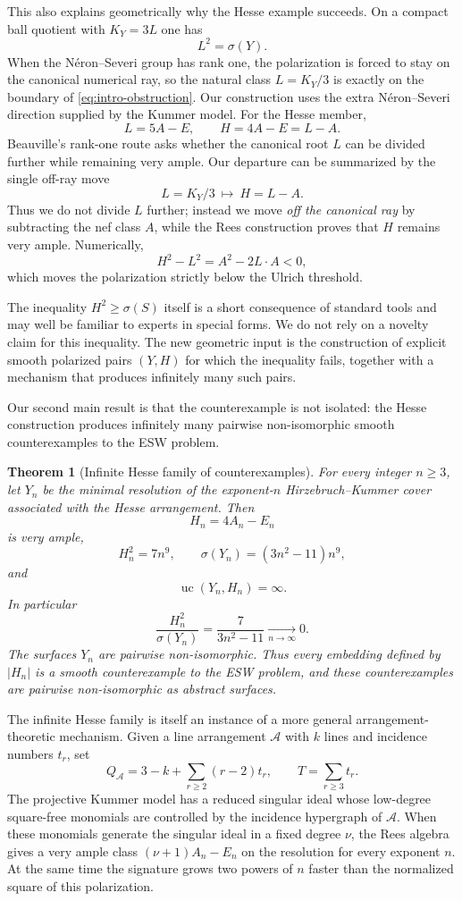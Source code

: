 \documentclass[11pt]{article}
\newtheorem{theorem}{Theorem}[section]
\newcommand{\cA}{\mathcal A}
\newcommand{\sig}{\sigma}
\newcommand{\uc}{\operatorname{uc}}
\begin{document}
This also explains geometrically why the Hesse example succeeds.  On a compact
ball quotient with $K_Y=3L$ one has
\[
        L^2=\sig(Y).
\]
When the N\'eron--Severi group has rank one, the polarization is forced to stay
on the canonical numerical ray, so the natural class $L=K_Y/3$ is exactly on the
boundary of \eqref{eq:intro-obstruction}.  Our construction uses the extra
N\'eron--Severi direction supplied by the Kummer model.  For the Hesse member,
\[
        L=5A-E,\qquad H=4A-E=L-A.
\]
Beauville's rank-one route asks whether the canonical root $L$ can be divided
further while remaining very ample.  Our departure can be summarized by the
single off-ray move
\[
             \boxed{\quad L=K_Y/3\ \longmapsto\ H=L-A.\quad}
\]
Thus we do not divide $L$ further; instead we move \emph{off the canonical ray}
by subtracting the nef class $A$, while the Rees construction proves that $H$
remains very ample.  Numerically,
\[
        H^2-L^2=A^2-2L\cdot A<0,
\]
which moves the polarization strictly below the Ulrich threshold.

The inequality $H^2\ge\sig(S)$ itself is a short consequence of standard tools and
may well be familiar to experts in special forms.  We do not rely on a novelty claim
for this inequality.  The new geometric input is the construction of explicit smooth
polarized pairs $(Y,H)$ for which the inequality fails, together with a mechanism that
produces infinitely many such pairs.

Our second main result is that the counterexample is not isolated: the Hesse
construction produces infinitely many pairwise non-isomorphic smooth counterexamples
to the ESW problem.

\begin{theorem}[Infinite Hesse family of counterexamples]\label{thm:intro-hesse-family}
For every integer $n\ge3$, let $Y_n$ be the minimal resolution of the exponent-$n$
Hirzebruch--Kummer cover associated with the Hesse arrangement.  Then
\[
        H_n=4A_n-E_n
\]
is very ample,
\[
        H_n^2=7n^9,
        \qquad
        \sig(Y_n)=(3n^2-11)n^9,
\]
and
\[
        \uc(Y_n,H_n)=\infty.
\]
In particular
\[
        \frac{H_n^2}{\sig(Y_n)}
        =\frac7{3n^2-11}\xrightarrow[n\to\infty]{}0.
\]
The surfaces $Y_n$ are pairwise non-isomorphic.  Thus every embedding defined by
$|H_n|$ is a smooth counterexample to the ESW problem, and these counterexamples are
pairwise non-isomorphic as abstract surfaces.
\end{theorem}

The infinite Hesse family is itself an instance of a more general
arrangement-theoretic mechanism.  Given a line arrangement $\cA$ with $k$ lines and incidence numbers
$t_r$, set
\[
        Q_{\cA}=3-k+\sum_{r\ge2}(r-2)t_r,
        \qquad
        T=\sum_{r\ge3}t_r.
\]
The projective Kummer model has a reduced singular ideal whose low-degree
square-free monomials are controlled by the incidence hypergraph of $\cA$.
When these monomials generate the singular ideal in a fixed degree $\nu$, the
Rees algebra gives a very ample class $(\nu+1)A_n-E_n$ on the resolution for
every exponent $n$.  At the same time the signature grows two powers of $n$
faster than the normalized square of this polarization.
\end{document}
